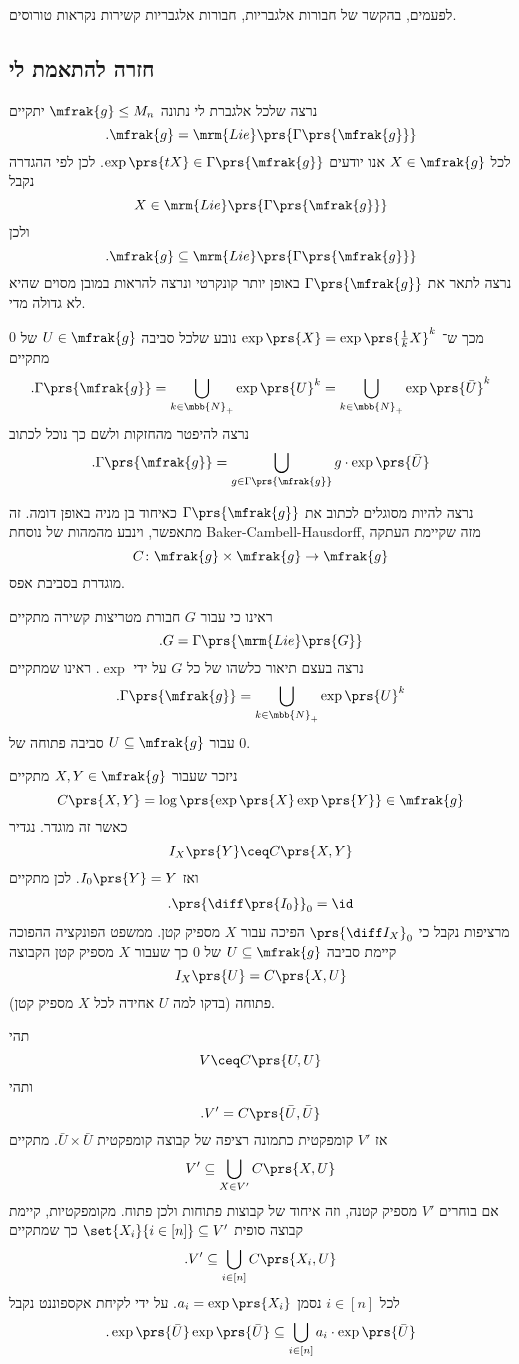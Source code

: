\documentclass[10pt, twoside]{book}
\newcommand{\textenglish}[1]{\foreignlanguage{english}{#1}}
\begin{document}
\begin{remark}
לפעמים, בהקשר של חבורות אלגבריות, חבורות אלגבריות קשירות נקראות טורוסים.
\end{remark}

\subsection{חזרה להתאמת לי}

נרצה שלכל אלגברת לי נתונה
$\mfrak{g} \leq M_n$
יתקיים
\[\text{.} \mfrak{g} = \mrm{Lie}\prs{\Gamma\prs{\mfrak{g}}}\]
לכל
$X \in \mfrak{g}$
אנו יודעים
$\exp\prs{tX} \in \Gamma\prs{\mfrak{g}}$.
לכן לפי ההגדרה נקבל
\[X \in \mrm{Lie}\prs{\Gamma\prs{\mfrak{g}}}\]
ולכן
\[\text{.} \mfrak{g} \subseteq \mrm{Lie}\prs{\Gamma\prs{\mfrak{g}}}\]
נרצה לתאר את
$\Gamma\prs{\mfrak{g}}$
באופן יותר קונקרטי ונרצה להראות במובן מסוים שהיא לא גדולה מדי.

מכך ש־%
$\exp\prs{X} = \exp\prs{\frac{1}{k} X}^k$
נובע שלכל סביבה
$U \in \mfrak{g}$
של
$0$
מתקיים
\[\text{.} \Gamma\prs{\mfrak{g}} = \bigcup_{k \in \mbb{N}_+} \exp\prs{U}^k = \bigcup_{k \in \mbb{N}_+} \exp\prs{\bar{U}}^k\]
נרצה להיפטר מהחזקות ולשם כך נוכל לכתוב
\[\text{.} \Gamma\prs{\mfrak{g}} = \bigcup_{g \in \Gamma\prs{\mfrak{g}}} g \cdot \exp\prs{\bar{U}}\]

נרצה להיות מסוגלים לכתוב את
$\Gamma\prs{\mfrak{g}}$
כאיחוד בן מניה באופן דומה.
זה מתאפשר, וינבע מהמהות של נוסחת
\textenglish{Baker-Cambell-Hausdorff},
מזה שקיימת העתקה
\[C \colon \mfrak{g} \times \mfrak{g} \to \mfrak{g}\]
מוגדרת בסביבת אפס.


ראינו כי עבור
$G$
חבורת מטריצות קשירה מתקיים
\[\text{.} G = \Gamma\prs{\mrm{Lie}\prs{G}}\]
נרצה בעצם תיאור כלשהו של כל
$G$
על ידי
$\exp$.
ראינו שמתקיים
\[\text{.} \Gamma\prs{\mfrak{g}} = \bigcup_{k \in \mbb{N}_+} \exp\prs{U}^k\]
עבור
$U \subseteq \mfrak{g}$
סביבה פתוחה של
$0$.

ניזכר שעבור
$X,Y \in \mfrak{g}$
מתקיים
\[C\prs{X,Y} = \log\prs{\exp\prs{X} \exp\prs{Y}} \in \mfrak{g}\]
כאשר זה מוגדר.
נגדיר
\[I_X\prs{Y} \ceq C\prs{X,Y}\]
ואז
$I_0\prs{Y} = Y$.
לכן מתקיים
\begin{align*}
\text{.} \prs{\diff\prs{I_0}}_0 = \id
\end{align*}
מרציפות נקבל כי
$\prs{\diff I_X}_0$
הפיכה עבור
$X$
מספיק קטן.
ממשפט הפונקציה ההפוכה קיימת סביבה
$U \subseteq \mfrak{g}$
של
$0$
כך שעבור
$X$
מספיק קטן הקבוצה
\[I_X\prs{U} = C\prs{X,U}\]
פתוחה (בדקו למה
$U$
אחידה לכל
$X$
מספיק קטן).

תהי
\[V \ceq C\prs{U,U}\]
ותהי
\[\text{.} V' = C\prs{\bar{U}, \bar{U}}\]
אז
$V'$
קומפקטית כתמונה רציפה של קבוצה קומפקטית
$\bar{U} \times \bar{U}$.
מתקיים
\[V' \subseteq \bigcup_{X \in V'} C\prs{X,U}\]
אם בוחרים
$V'$
מספיק קטנה, וזה איחוד של קבוצות פתוחות ולכן פתוח.
מקומפקטיות, קיימת קבוצה סופית
$\set{X_i}{i \in [n]} \subseteq V'$
כך שמתקיים
\[\text{.} V' \subseteq \bigcup_{i \in [n]} C\prs{X_i, U}\]
לכל
$i \in [n]$
נסמן
$a_i = \exp\prs{X_i}$.
על ידי לקיחת אקספוננט נקבל
\[\text{.} \exp\prs{\bar{U}} \exp\prs{\bar{U}} \subseteq \bigcup_{i \in [n]} a_i \cdot \exp\prs{\bar{U}}\]
\end{document}
